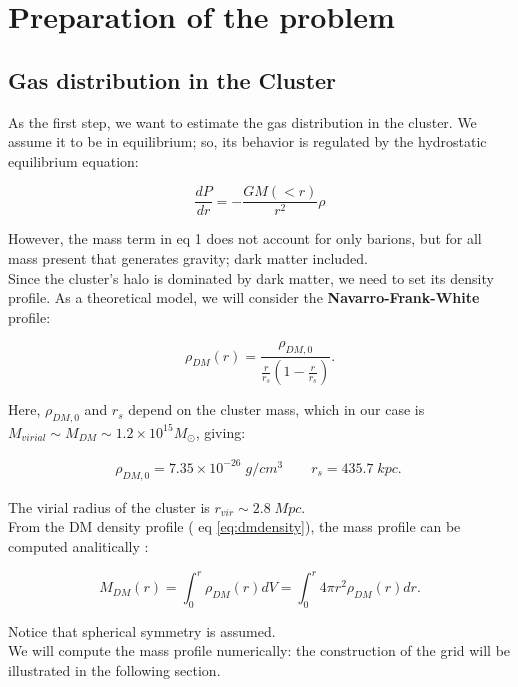 \documentclass{article}
\begin{document}
\section{Preparation of the problem}
\subsection{Gas distribution in the Cluster}

As the first step, we want to estimate the gas distribution in the cluster. We assume it to be in equilibrium; so, its behavior is regulated by the hydrostatic equilibrium equation:

\begin{equation} \frac{dP}{dr}=-\frac{GM(<r)}{r^{2}}\rho \end{equation}

However, the mass term in eq 1 does not account for only barions, but for all mass present that generates gravity; dark matter included.\\ 
Since the cluster's halo is dominated by dark matter, we need to set its density profile. As a theoretical model, we will consider the \textbf{Navarro-Frank-White} profile:

\begin{equation}
\rho_{DM}(r)=\frac{\rho_{DM,0}}{\frac{r}{r_{s}}(1-\frac{r}{r_{s}})}.\label{eq:dmdensity}
\end{equation}

Here, \(\rho_{DM,0}\) and \(r_{s}\) depend on the cluster mass, which in our case is \(M_{virial}\sim M_{DM}\sim 1.2 \times 10^{15}M_{\odot}\), giving:

\vspace{-10 mm}
\begin{center}
\begin{align*}
\rho_{DM,0}=7.35\times 10^{-26}\; g/cm^{3}\qquad r_{s}=435.7\;kpc.\
\end{align*}
\end{center}
\vspace{2 mm}

The virial radius of the cluster is \(r_{vir}\sim 2.8 \;Mpc\).\\
From the DM density profile ( eq \ref{eq:dmdensity}), the mass profile can be computed analitically :

\begin{equation}
M_{DM}(r)=\int_{0}^{r}\rho_{DM}(r)dV=\int_{0}^{r}4\pi r^{2}\rho_{DM}(r)dr.
\end{equation}

Notice that spherical symmetry is assumed.\\
We will compute the mass profile numerically: the construction of the grid will be illustrated in the following section.
\end{document}
